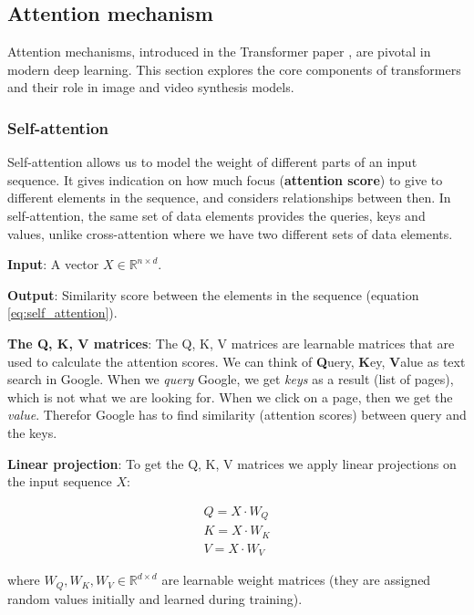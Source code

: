 \subsection{Attention mechanism}
\label{appendix:attention}

Attention mechanisms, introduced in the Transformer paper \cite{transformer}, are pivotal in modern deep learning. This section explores the core components of transformers and their role in image and video synthesis models.






\subsubsection{Self-attention}

Self-attention allows us to model the weight of different parts of an input sequence. It gives indication on how much focus (\textbf{attention score}) to give to different elements in the sequence, and considers relationships between then. In self-attention, the same set of data elements provides the queries, keys and values, unlike cross-attention where we have two different sets of data elements.

\textbf{Input}: A vector $X \in \mathbb{R}^{n \times d}$.

\textbf{Output}: Similarity score between the elements in the sequence (equation \ref{eq:self_attention}).

\textbf{The Q, K, V matrices}: The Q, K, V matrices are learnable matrices that are used to calculate the attention scores. We can think of \textbf{Q}uery, \textbf{K}ey, \textbf{V}alue as text search in Google. When we \textit{query} Google, we get \textit{keys} as a result (list of pages), which is not what we are looking for. When we click on a page, then we get the \textit{value}. Therefor Google has to find similarity (attention scores) between query and the keys.

\textbf{Linear projection}: To get the Q, K, V matrices we apply linear projections on the input sequence $X$: 

\begin{align*}
    Q = X\cdot W_Q \\
    K = X\cdot W_K \\
    V = X\cdot W_V
\end{align*}

where $W_Q, W_K, W_V \in \mathbb{R}^{d \times d}$ are learnable weight matrices (they are assigned random values initially and learned during training).



